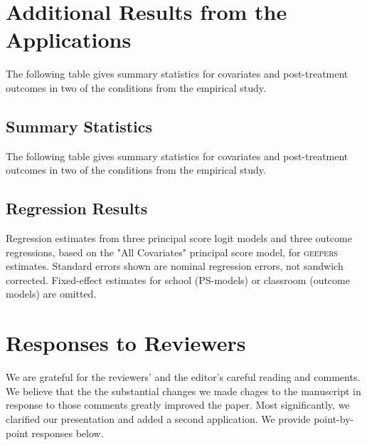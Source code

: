 \documentclass[]{article}
\begin{document}
\section{Additional Results from the Applications}
\singlespacing
The following table gives summary statistics for covariates and post-treatment outcomes in two of the conditions from the empirical study.\\


\subsection{Summary Statistics}
The following table gives summary statistics for covariates and post-treatment outcomes in two of the conditions from the empirical study.\\
\small

\clearpage

\small


\subsection{Regression Results}
Regression estimates from three principal score logit models and three outcome regressions, based on the "All Covariates" principal score model, for \textsc{geepers} estimates. Standard errors shown are nominal regression errors, not sandwich corrected. Fixed-effect estimates for school (PS-models) or classroom (outcome models) are omitted.

\small
%





\clearpage

\section{Responses to Reviewers}
We are grateful for the reviewers' and the editor's careful reading
and comments. We believe that the the substantial changes we made
chages to the manuscript in response to those comments greatly
improved the paper. Most significantly, we clarified our presentation
and added a second application.
We provide point-by-point responses below.
\end{document}
